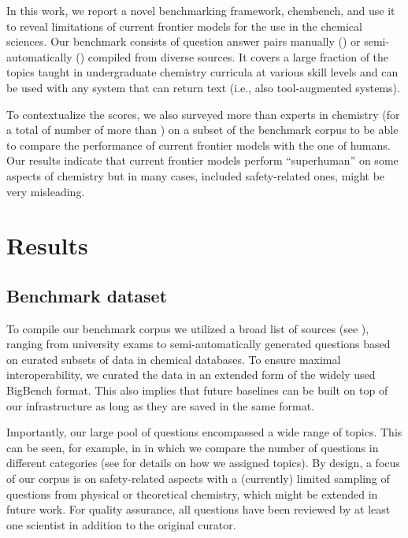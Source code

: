\documentclass[11pt, oneside]{article}
\begin{document}
In this work, we report a novel benchmarking framework, chembench, and use it to reveal limitations of current frontier models for the use in the chemical sciences.
Our benchmark consists of \unskip question answer pairs manually (\unskip) or semi-automatically (\unskip) compiled from diverse sources.
It covers a large fraction of the topics taught in undergraduate chemistry curricula at various skill levels and can be used with any system that can return text (i.e., also tool-augmented systems).

To contextualize the scores, we also surveyed more than  experts in chemistry (for a total of number of more than \unskip) on a subset of the benchmark corpus to be able to compare the performance of current frontier models with the one of humans.
Our results indicate that current frontier models perform \enquote{superhuman} on some aspects of chemistry but in many cases, included safety-related ones, might be very misleading.


\section{Results}

\subsection{Benchmark dataset}

To compile our benchmark corpus we utilized a broad list of sources (see ), ranging from university exams to semi-automatically generated questions based on curated subsets of data in chemical databases.
To ensure maximal interoperability, we curated the data in an extended form of the widely used BigBench format.
This also implies that future baselines can be built on top of our infrastructure as long as they are saved in the same format.


Importantly, our large pool of questions encompassed a wide range of topics.
This can be seen, for example, in  in which we compare the number of questions in different categories (see  for details on how we assigned topics).
By design, a focus of our corpus is on safety-related aspects with a (currently) limited sampling of questions from physical or theoretical chemistry, which might be extended in future work.
For quality assurance, all questions have been reviewed by at least one scientist in addition to the original curator.
\end{document}

